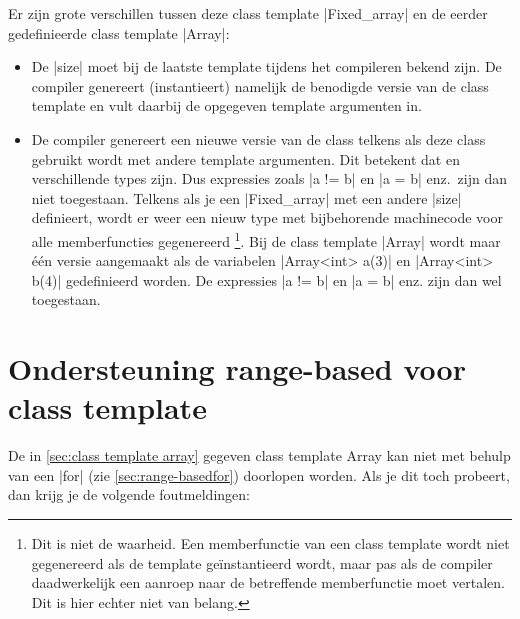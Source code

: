 \begin{cpplstShortInline}
Er zijn grote verschillen tussen deze class template |Fixed_array| en de eerder gedefinieerde class template |Array|:
\begin{itemize}
    \item De |size| moet bij de laatste template tijdens het compileren bekend zijn. 
    De compiler genereert (instantieert) namelijk de benodigde versie van de class template en vult daarbij de opgegeven template argumenten in.
    \item De compiler genereert een nieuwe versie van de class telkens als deze class gebruikt wordt met andere template argumenten.
    Dit betekent dat  en  verschillende types zijn.
    Dus expressies zoals |a != b| en |a = b| enz.\ zijn dan niet toegestaan.
    Telkens als je een |Fixed_array| met een andere |size| definieert, wordt er weer een nieuw type met bijbehorende machinecode voor alle memberfuncties gegenereerd%
    \footnote{%
        Dit is niet de waarheid. 
        Een memberfunctie van een class template wordt niet gegenereerd als de template geïnstantieerd wordt, maar pas als de compiler daadwerkelijk een aanroep naar de betreffende memberfunctie moet vertalen.
        Dit is hier echter niet van belang.
    }.
    Bij de class template |Array| wordt maar één versie aangemaakt als de variabelen |Array<int> a(3)| en |Array<int> b(4)| gedefinieerd worden.
    De expressies |a != b| en |a = b| enz. zijn dan wel toegestaan.
\end{itemize}

\section[Ondersteuning range-based \texttt{for} voor class template \texttt{Array}]{Ondersteuning range-based \texorpdfstring{}{for} voor class template \texorpdfstring{}{Array}}
De in \cref{sec:class template array} gegeven class template Array kan niet met behulp van een  |for| (zie \cref{sec:range-basedfor}) doorlopen worden. Als je dit toch probeert, dan krijg je de volgende foutmeldingen:

\begin{cpplstfragment}[mathescape=true]
    for (auto e: v) {
    //  $\color{hrred}\textbf{error:}$  'begin' was not declared in this scope; did you mean 'std::begin'?
    //  $\color{hrred}\textbf{error:}$  'end' was not declared in this scope; did you mean 'std::end'?
\end{cpplstfragment}


\end{cpplstShortInline}
